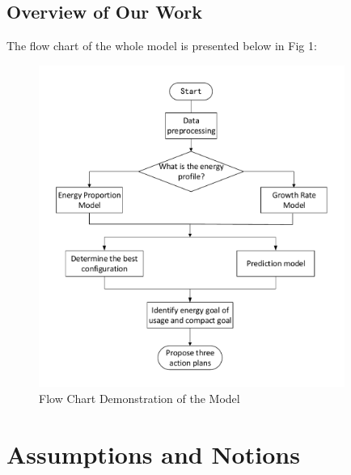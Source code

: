 \documentclass{mcmthesis}
\begin{document}
\subsection{Overview of Our Work}
The flow chart of the whole model is presented below in Fig 1:
\begin{figure}
	\centering
	\includegraphics[width=10cm]{figure/float}
	\caption{Flow Chart Demonstration of the Model}
	\label{fig:float}
\end{figure}
\section{Assumptions and Notions}
\end{document}
